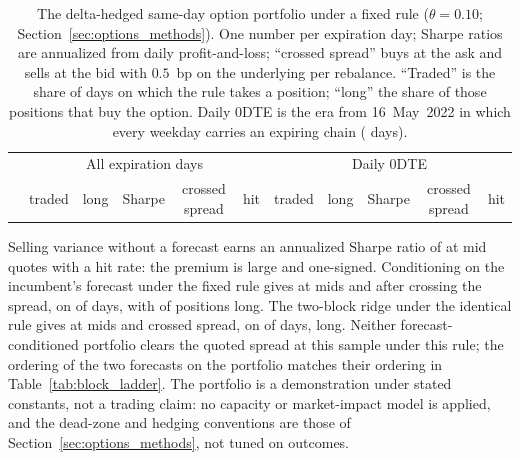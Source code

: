 \begin{table}[H]
\centering
\caption{The delta-hedged same-day option portfolio under a fixed rule
($\theta = 0.10$; Section~\ref{sec:options_methods}). One number per
expiration day; Sharpe ratios are annualized from daily
profit-and-loss; ``crossed spread'' buys at the ask and sells at the bid with
$0.5$~bp on the underlying per rebalance. ``Traded'' is the share of
days on which the rule takes a position; ``long'' the share of those
positions that buy the option. Daily 0DTE is the era from 16~May~2022
in which every weekday carries an expiring chain
(\optDailyNDays{} days).
\label{tab:options_bare}}
\begin{tabular}{@{}l ccccc ccccc@{}}
\toprule
 & \multicolumn{5}{c}{All expiration days} & \multicolumn{5}{c}{Daily 0DTE} \\
\cmidrule(lr){2-6} \cmidrule(lr){7-11}
 & traded & long & Sharpe & crossed spread & hit & traded & long & Sharpe & crossed spread & hit \\
\midrule

\end{tabular}
\end{table}

Selling variance without a forecast earns an annualized Sharpe ratio of
\optBareCtrlShMid{} at mid quotes with a \optBareCtrlHit{} hit rate:
the premium is large and one-signed. Conditioning on the incumbent's
forecast under the fixed rule gives \optBareAzeroShMid{} at mids and
\optBareAzeroShX{} after crossing the spread, on \optBareAzeroTraded{}
of days, with \optBareAzeroLong{} of positions long. The two-block ridge
under the identical rule gives \optBareBlkShMid{} at mids and
\optBareBlkShX{} crossed spread, on \optBareBlkTraded{} of days,
\optBareBlkLong{} long. Neither forecast-conditioned portfolio clears the
quoted spread at this sample under this rule; the ordering of the two
forecasts on the portfolio matches their ordering in
Table~\ref{tab:block_ladder}. The portfolio is a demonstration under stated
constants, not a trading claim: no capacity or market-impact model is
applied, and the dead-zone and hedging conventions are those of
Section~\ref{sec:options_methods}, not tuned on outcomes.

\fi

